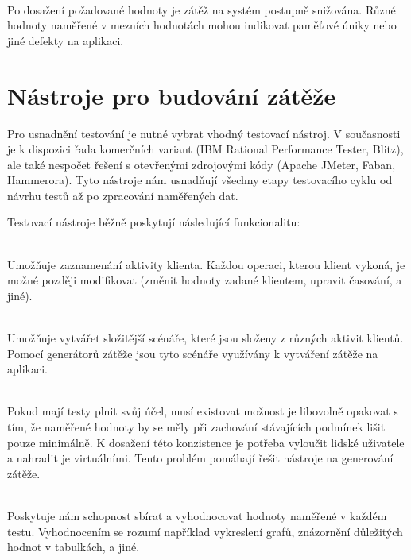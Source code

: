 \documentclass[122pt,oneside]{fithesis}
\begin{document}
\vspace{5 mm}
\\\indent Po dosažení požadované hodnoty je zátěž na systém postupně snižována. Různé hodnoty naměřené v mezních hodnotách mohou indikovat paměťové úniky nebo jiné defekty na aplikaci.

\section{Nástroje pro budování zátěže}

Pro usnadnění testování je nutné vybrat vhodný testovací nástroj. V současnosti je k dispozici řada komerčních variant (IBM Rational Performance Tester, Blitz), ale také nespočet řešení s otevřenými zdrojovými kódy (Apache JMeter, Faban, Hammerora). Tyto nástroje nám usnadňují všechny etapy testovacího cyklu od návrhu testů až po zpracování naměřených dat. 

Testovací nástroje běžně poskytují následující funkcionalitu:

\vspace{5 mm}
\\\indent Umožňuje zaznamenání aktivity klienta. Každou operaci, kterou klient vykoná, je možné později modifikovat (změnit hodnoty zadané klientem, upravit časování, a jiné).

\vspace{5 mm}
\\\indent Umožňuje vytvářet složitější scénáře, které jsou složeny z různých aktivit klientů. Pomocí generátorů zátěže jsou tyto scénáře využívány k vytváření zátěže na aplikaci.

\vspace{5 mm}
\\\indent Pokud mají testy plnit svůj účel, musí existovat možnost je libovolně opakovat s tím, že naměřené hodnoty by se měly při zachování stávajících podmínek lišit pouze minimálně. K dosažení této konzistence je potřeba vyloučit lidské uživatele a nahradit je virtuálními. Tento problém pomáhají řešit nástroje na generování zátěže.

\vspace{5 mm}
\\\indent Poskytuje nám schopnost sbírat a vyhodnocovat hodnoty naměřené v každém testu. Vyhodnocením se rozumí například vykreslení grafů, znázornění důležitých hodnot v tabulkách, a jiné.
\end{document}
